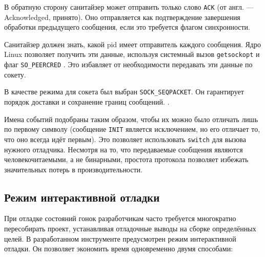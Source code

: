 В обратную сторону санитайзер может отправить только слово \texttt{ACK} (от англ. --- Acknowledged, принято). Оно отправляется как подтверждение завершения обработки предыдущего сообщения, если это требуется флагом синхронности.

Санитайзер должен знать, какой pid имеет отправитель каждого сообщения. Ядро Linux позволяет получить эти данные, используя системный вызов \texttt{getsockopt} и флаг \texttt{SO\_PEERCRED} \cite{seqpacket}. Это избавляет от необходимости передавать эти данные по сокету.

В качестве режима для сокета был выбран \texttt{SOCK\_SEQPACKET}. Он гарантирует порядок доставки и сохранение границ сообщений. \cite{seqpacket}.

Имена событий подобраны таким образом, чтобы их можно было отличать лишь по первому символу (сообщение \texttt{INIT} является исключением, но его отличает то, что оно всегда идёт первым). Это позволяет использовать \texttt{switch} для вызова нужного отладчика. Несмотря на то, что передаваемые сообщения являются человекочитаемыми, а не бинарными, простота протокола позволяет избежать значительных потерь в производительности.

\subsection{Режим интерактивной отладки}

При отладке состояний гонок разработчикам часто требуется многократно пересобирать проект, устанавливая отладочные выводы на сборке определённых целей. В разработанном инструменте предусмотрен режим интерактивной отладки. Он позволяет экономить время одновременно двумя способами:

